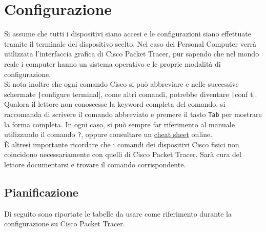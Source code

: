 \documentclass[a4paper,12pt]{report}
\begin{document}
\chapter{Configurazione}
Si assume che tutti i dispositivi siano accesi e le configurazioni siano effettuate tramite il terminale del dispositivo scelto.
%
Nel caso dei Personal Computer verrà utilizzata l'interfaccia grafica di Cisco Packet Tracer, pur sapendo che nel mondo reale i computer hanno un sistema operativo e le proprie modalità di configurazione.
%
\\Si nota inoltre che ogni comando Cisco si può abbreviare e nelle successive schermate \texttt|configure terminal|, come altri comandi, potrebbe diventare \texttt|conf t|.
%
Qualora il lettore non conoscesse la keyword completa del comando, si raccomanda di scrivere il comando abbreviato e premere il tasto \texttt{Tab} per mostrare la forma completa.
%
In ogni caso, si può sempre far riferimento al manuale utilizzando il comando \texttt{?}, oppure consultare un \href{https://www.websentra.com/cisco-commands-cheat-sheet/}{cheat sheet} online.
%
\\È altresì importante ricordare che i comandi dei dispositivi Cisco fisici non coincidono necessariamente con quelli di Cisco Packet Tracer.
%
Sarà cura del lettore documentarsi e trovare il comando corrispondente.
\section{Pianificazione}
Di seguito sono riportate le tabelle da usare come riferimento durante la configurazione su Cisco Packet Tracer.
\end{document}
